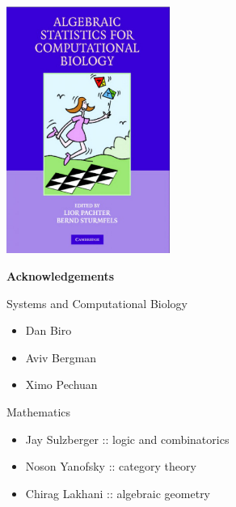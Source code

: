 	\begin{frame}
	\vspace{3em}
	\begin{center}
	\includegraphics[width=0.4\textwidth]{fig/ASCB_Cover.jpg}
	\end{center}
	\end{frame}
	
	\begin{frame}
	\textbf{Acknowledgements}
	\begin{block}{Systems and Computational Biology}
	\begin{small}	
	\begin{itemize}
	\item Dan Biro
	\item Aviv Bergman
	\item Ximo Pechuan
	\end{itemize}		
	\end{small}
	\end{block}
	\begin{block}{Mathematics}
	\begin{small}	
	\begin{itemize}
	\item Jay Sulzberger :: logic and combinatorics
	\item Noson Yanofsky :: category theory
	\item Chirag Lakhani :: algebraic geometry
	\end{itemize}		
	\end{small}
	\end{block}
	\end{frame}
	
%	
	
